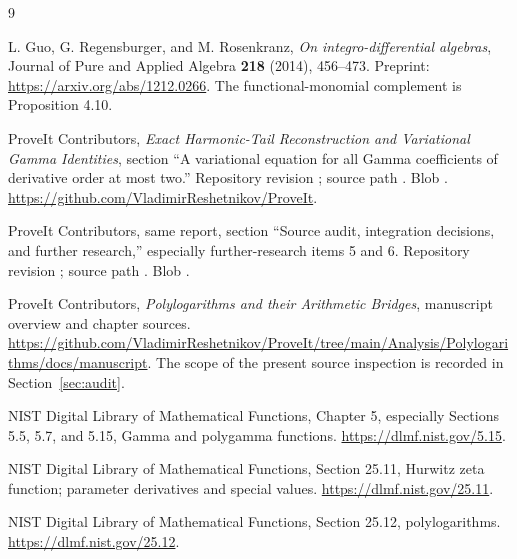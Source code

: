 \begin{thebibliography}{9}

L. Guo, G. Regensburger, and M. Rosenkranz,
\emph{On integro-differential algebras},
Journal of Pure and Applied Algebra \textbf{218} (2014), 456--473.
Preprint: \url{https://arxiv.org/abs/1212.0266}.
The functional-monomial complement is Proposition 4.10.

ProveIt Contributors,
\emph{Exact Harmonic-Tail Reconstruction and Variational Gamma Identities},
section ``A variational equation for all Gamma coefficients of derivative order at most two.''
Repository revision \texttt{\sourcecommit}; source path
.
Blob .
\url{https://github.com/VladimirReshetnikov/ProveIt}.

ProveIt Contributors, same report, section ``Source audit, integration decisions, and further research,'' especially further-research items 5 and 6.
Repository revision \texttt{\sourcecommit}; source path
.
Blob .

ProveIt Contributors,
\emph{Polylogarithms and their Arithmetic Bridges}, manuscript overview and chapter sources.
\url{https://github.com/VladimirReshetnikov/ProveIt/tree/main/Analysis/Polylogarithms/docs/manuscript}.
The scope of the present source inspection is recorded in Section~\ref{sec:audit}.

NIST Digital Library of Mathematical Functions,
Chapter 5, especially Sections 5.5, 5.7, and 5.15, Gamma and polygamma functions.
\url{https://dlmf.nist.gov/5.15}.

NIST Digital Library of Mathematical Functions,
Section 25.11, Hurwitz zeta function; parameter derivatives and special values.
\url{https://dlmf.nist.gov/25.11}.

NIST Digital Library of Mathematical Functions,
Section 25.12, polylogarithms.
\url{https://dlmf.nist.gov/25.12}.

\end{thebibliography}
